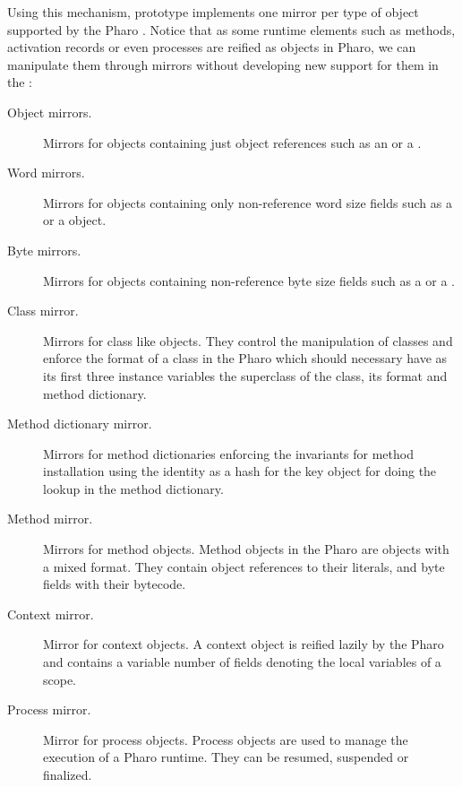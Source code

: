 Using this mechanism, \Vtt prototype implements one mirror per type of object supported by the Pharo \VM. Notice that as some runtime elements such as methods, activation records or even processes are reified as objects in Pharo, we can manipulate them through mirrors without developing new support for them in the \VM:

\begin{description}
\item[Object mirrors.] Mirrors for objects containing just object references such as an  or a .
\item[Word mirrors.] Mirrors for objects containing only non-reference word size fields such as a  or a  object.
\item[Byte mirrors.] Mirrors for objects containing non-reference byte size fields such as a  or a . 
\item[Class mirror.] Mirrors for class like objects. They control the manipulation of classes and enforce the format of a class in the Pharo \VM which should necessary have as its first three instance variables the superclass of the class, its format and method dictionary.
\item[Method dictionary mirror.] Mirrors for method dictionaries enforcing the \VM invariants for method installation \ie using the identity as a hash for the key object for doing the lookup in the method dictionary.
\item[Method mirror.] Mirrors for method objects. Method objects in the Pharo \VM are objects with a mixed format. They contain object references to their literals, and byte fields with their bytecode.
\item[Context mirror.] Mirror for context objects. A context object is reified lazily by the Pharo \VM and contains a variable number of fields denoting the local variables of a scope.
\item[Process mirror.] Mirror for process objects. Process objects are used to manage the execution of a Pharo runtime. They can be resumed, suspended or finalized.
\end{description}



